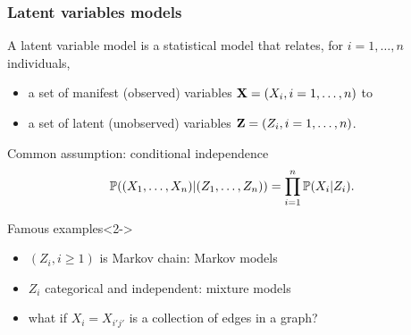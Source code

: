 \documentclass{beamer}\usepackage[]{graphicx}\usepackage[]{color}
\begin{document}
\begin{frame}
  \frametitle{Latent variables models}

  \begin{definition}
    A \alert{latent variable model} is a statistical model that relates, for $i=1,\dots,n$ individuals,
  \begin{itemize}
    \item a set of \alert{manifest} (observed) variables $\mathbf{X} = (X_i, i=1,\dots,n)$ to
    \item a set of \alert{latent} (unobserved) variables $\mathbf{Z} = (Z_i, i=1,\dots,n)$.
    \end{itemize}
  \end{definition}

  \begin{block}{Common assumption: conditional independence}
    \vspace{-.5cm}
    \begin{equation*}
      \mathbb{P}((X_1, \dots, X_n)|(Z_1,\dots, Z_n))  = \prod_{i=1}^n \mathbb{P}(X_i| Z_i).
    \end{equation*}
  \end{block}

  \vspace{-.25cm}

  \begin{block}{Famous examples}<2->
    \vspace{-.25cm}
    \begin{itemize}
      \item $(Z_i, i\geq 1)$ is Markov chain: \alert{Markov models}
      \item $Z_i$ categorical and independent: \alert{mixture models}
      \item<3> \alert{what if $X_i = X_{i'j'}$ is a collection of edges in a graph?}
    \end{itemize}
  \end{block}

\end{frame}
\end{document}

